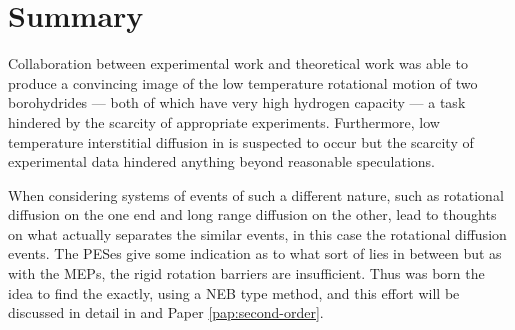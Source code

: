 \section{Summary}
\label{sec:borohydrides-summary}

Collaboration between experimental work and theoretical work was able to produce a convincing image of the low temperature rotational motion of two borohydrides --- both of which have very high hydrogen capacity --- a task hindered by the scarcity of appropriate experiments.
Furthermore, low temperature  interstitial diffusion in  is suspected to occur but the scarcity of experimental data hindered anything beyond reasonable speculations.

When considering systems of events of such a different nature, such as rotational diffusion on the one end and long range diffusion on the other, lead to thoughts on what actually separates the similar events, in this case the rotational diffusion events.
The PESes give some indication as to what sort of  lies in between but as with the MEPs, the rigid rotation barriers are insufficient.
Thus was born the idea to find the  exactly, using a NEB type method, and this effort will be discussed in detail in  and Paper \ref{pap:second-order}.
